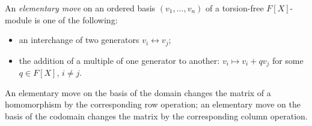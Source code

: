 An \emph{elementary move} on an ordered basis $(v_1, \ldots, v_n)$ of a torsion-free $F[X]$-module is one of the following:
\begin{itemize}
\item[(i)] an interchange of two generators $v_i \leftrightarrow v_j$;
\item[(ii)] the addition of a multiple of one generator to another: $v_i \mapsto v_i + q v_j$ for some $q \in F[X]$, $i \neq j$.
\end{itemize}
An elementary move on the basis of the domain changes the matrix of a homomorphism by the corresponding row operation; an elementary move on the basis of the codomain changes the matrix by the corresponding column operation.
